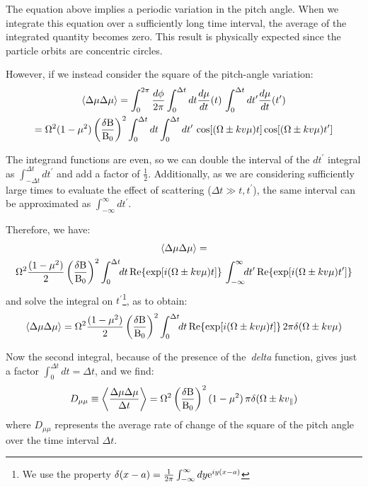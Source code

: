 The equation above implies a periodic variation in the pitch angle. When we integrate this equation over a sufficiently long time interval, the average of the integrated quantity becomes zero. This result is physically expected since the particle orbits are concentric circles.

However, if we instead consider the square of the pitch-angle variation: 
%
\begin{multline}
\langle \Delta \mu \Delta \mu \rangle = \int_0^{2\pi} \frac{d\phi}{2\pi} \int_0^{\Delta t} dt \frac{d\mu}{dt}(t) \, \int_0^{\Delta t} dt^\prime \frac{d\mu}{dt}(t^\prime) \\ = \Omega^2 (1 - \mu^2) \left( \frac{\delta {\rm B}}{{\rm B}_0} \right)^2 \int_{0}^{\Delta t} dt \int_{0}^{\Delta t} dt^\prime \, \cos[(\Omega \pm k v \mu) t] \cos[(\Omega \pm k v \mu) t^\prime]
\end{multline}

The integrand functions are even, so we can double the interval of the $dt^\prime$ integral as $\int_{-\Delta t}^{\Delta t} dt^\prime$ and add a factor of $\frac{1}{2}$. Additionally, as we are considering sufficiently large times to evaluate the effect of scattering ($\Delta t \gg t, t^\prime$), the same interval can be approximated as $\int_{-\infty}^{\infty} dt^\prime$.

Therefore, we have:
%
\begin{multline}
\langle \Delta \mu \Delta \mu \rangle = \\ \Omega^2 \frac{(1 - \mu^2)}{2} \left( \frac{\delta {\rm B}}{{\rm B}_0} \right)^2 \int_{0}^{\Delta t} \!\! dt \, {\rm Re} \{ \exp[i(\Omega \pm k v \mu) t] \} \, \int_{-\infty}^{\infty} \!\! dt^\prime \,  {\rm Re}\{\exp[i(\Omega \pm k v \mu) t^\prime]\}
\end{multline}
%
and solve the integral on $t^\prime$\footnote{We use the property $\delta(x-a) = \frac{1}{2\pi}\int_{-\infty}^\infty dy {\rm e}^{iy(x-a)}$}, as to obtain:
%
\begin{equation}
\langle \Delta \mu \Delta \mu \rangle = \Omega^2 \frac{(1 - \mu^2)}{2} \left( \frac{\delta {\rm B}}{{\rm B}_0} \right)^2 \int_{0}^{\Delta t} \!\! dt \, {\rm Re} \{ \exp[i(\Omega \pm k v \mu) t] \} \, 2\pi \delta (\Omega \pm k v \mu)
\end{equation}

Now the second integral, because of the presence of the~\emph{delta} function, gives just a factor $\int_{0}^{\Delta t} dt = \Delta t$, and we find:
%
\begin{equation}
D_{\mu\mu} \equiv \left\langle \frac{\Delta \mu \Delta \mu}{\Delta t} \right\rangle = \Omega^2 \left( \frac{\delta {\rm B}}{{\rm B}_0} \right)^2 (1 - \mu^2) \, \pi \delta(\Omega \pm k v_{\parallel})
\label{eq:dmumuvar}
\end{equation}
%
where $D_{\mu \mu}$ represents the average rate of change of the square of the pitch angle over the time interval $\Delta t$.

